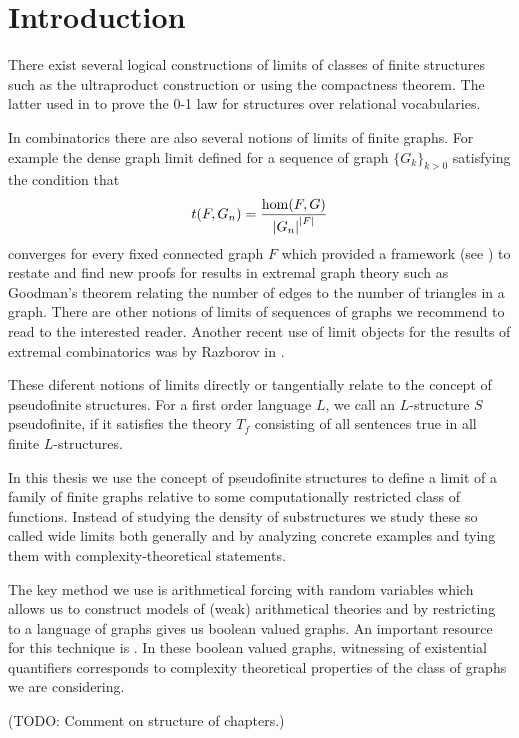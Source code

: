 \chapter*{Introduction}

There exist several logical constructions of limits of classes of finite structures such as the ultraproduct construction or using the compactness theorem. The latter used in \cite{Fagin1976} to prove the 0-1 law for structures over relational vocabularies.

In combinatorics there are also several notions of limits of finite graphs. For example the dense graph limit defined for a sequence of graph $\{G_k\}_{k>0}$ satisfying the condition that
\[t(F,G_n)=\frac{\hom(F,G)}{\left|{G_n}\right|^{\left|{F}\right|}}\]
converges for every fixed connected graph $F$ which provided a framework (see \cite{lovasz2006limits}) to restate and find new proofs for results in extremal graph theory such as Goodman's theorem relating the number of edges to the number of triangles in a graph. There are other notions of limits of sequences of graphs we recommend to read \cite{Nesetril2013} to the interested reader. Another recent use of limit objects for the results of extremal combinatorics was by Razborov in \cite{razborov2007flag}.

These diferent notions of limits directly or tangentially relate to the concept of pseudofinite structures. For a first order language $L$, we call an $L$-structure $S$ pseudofinite, if it satisfies the theory $T_f$ consisting of all sentences true in all finite $L$-structures.

In this thesis we use the concept of pseudofinite structures to define a limit of a family of finite graphs relative to some computationally restricted class of functions. Instead of studying the density of substructures we study these so called wide limits both generally and by analyzing concrete examples and tying them with complexity-theoretical statements.

The key method we use is arithmetical forcing with random variables which allows us to construct models of (weak) arithmetical theories and by restricting to a language of graphs gives us boolean valued graphs. An important resource for this technique is \cite{krajicek2010forcing}. In these boolean valued graphs, witnessing of existential quantifiers corresponds to complexity theoretical properties of the class of graphs we are considering. 

(TODO: Comment on structure of chapters.)
